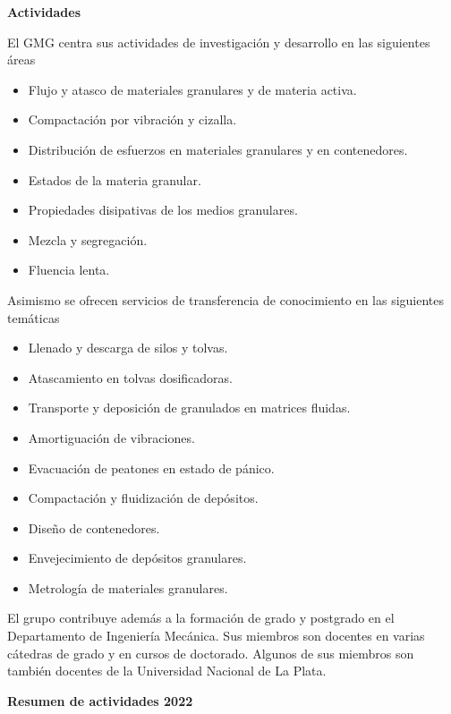 \documentclass[a4paper,11pt,twoside,final,titlepage,onecolumn,openright]{report}
\begin{document}
\vspace{0.5cm}
{\bf Actividades}
\vspace{0.5cm}

El GMG centra sus actividades de investigación y desarrollo en las siguientes áreas

\begin{itemize}
 \item Flujo y atasco de materiales granulares y de materia activa.
 \item Compactación por vibración y cizalla.
 \item Distribución de esfuerzos en materiales granulares y en contenedores.
 \item Estados de la materia granular.
 \item Propiedades disipativas de los medios granulares.
 \item Mezcla y segregación.
 \item Fluencia lenta.
\end{itemize}

Asimismo se ofrecen servicios de transferencia de conocimiento en las siguientes temáticas

\begin{itemize}
 \item Llenado y descarga de silos y tolvas.
 \item Atascamiento en tolvas dosificadoras.
 \item Transporte y deposición de granulados en matrices fluidas.
 \item Amortiguación de vibraciones.
 \item Evacuación de peatones en estado de pánico.
 \item Compactación y fluidización de depósitos.
 \item Diseño de contenedores.
 \item Envejecimiento de depósitos granulares.
 \item Metrología de materiales granulares.
\end{itemize}

El grupo contribuye además a la formación de grado y postgrado en el Departamento de Ingeniería Mecánica. Sus miembros son docentes en varias cátedras de grado y en cursos de doctorado. Algunos de sus miembros son también docentes de la Universidad Nacional de La Plata.

\vspace{0.5cm}

{\bf Resumen de actividades 2022}
\end{document}
